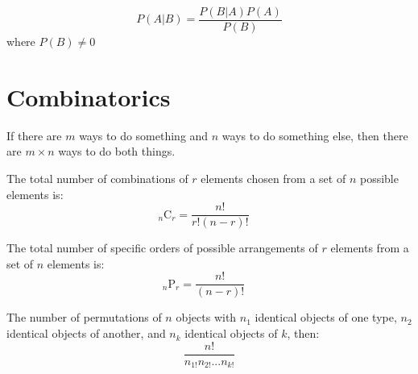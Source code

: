 \documentclass[11pt]{article}
\newcommand{\comb}[2]{{}_{#1}\mathrm{C}_{#2}}
\newcommand{\perm}[2]{{}_{#1}\mathrm{P}_{#2}}
\begin{document}
\begin{definition}\label{def:bayes-thm}
    \begin{equation*}
        P(A | B) = \frac{P(B | A) P(A)}{P(B)}
    \end{equation*}
    where $P(B) \neq 0$
\end{definition}

\section{Combinatorics}

\begin{definition}\label{def:fund-count-principle}
    If there are $m$ ways to do something and $n$ ways to do something else, then there are
    $m \times n$ ways to do both things.
\end{definition}

\begin{definition}\label{def:combinations-formula}
    The total number of combinations of $r$ elements chosen from a set of $n$ possible elements is:
    \begin{equation*}
        \comb{n}{r} = \frac{n!}{r!(n-r)!}\quad
    \end{equation*}
\end{definition}

\begin{definition}\label{def:permutations-formula}
    The total number of specific orders of possible arrangements of $r$
    elements from a set of $n$ elements is:
    \begin{equation*}
        \perm{n}{r} = \frac{n!}{(n-r)!}\quad
    \end{equation*}

    The number of permutations of $n$ objects with $n_1$ identical objects
    of one type, $n_2$ identical objects of another, and $n_k$ identical objects
    of $k$, then:
    \begin{equation*}
        \frac{n!}{n_{1!}n_{2!} ... n_{k!}}
    \end{equation*}
\end{definition}
\end{document}
